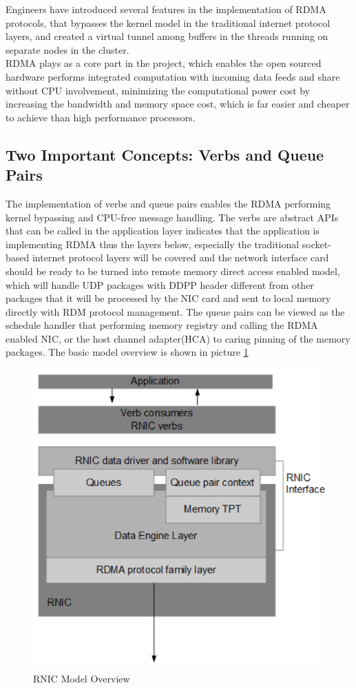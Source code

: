 \documentclass[11pt,openright,a4paper]{report}
\begin{document}
Engineers have introduced several features in the implementation of RDMA protocols, that bypasses the kernel model in the traditional internet protocol layers, and created a virtual tunnel among buffers in the threads running on separate nodes in the cluster.\\
RDMA plays as a core part in the project, which enables the open sourced hardware performs integrated computation with incoming data feeds and share without CPU involvement,  minimizing the computational power cost by increasing the bandwidth and memory space cost, which is far easier and cheaper to achieve than high performance processors.\\
\subsection{Two Important Concepts: Verbs and Queue Pairs}
The implementation of verbs and queue pairs enables the RDMA performing kernel bypassing and CPU-free message handling\cite{recio2003rdma}. The verbs are abstract APIs that can be called in the application layer indicates that the application is implementing RDMA thus the layers below, especially the traditional socket-based internet protocol layers will be covered and the network interface card should be ready to be turned into remote memory direct access enabled model,  which will handle UDP packages with DDPP header different from other packages that it will be processed by the NIC card and sent to local memory directly with RDM protocol management. The queue pairs can be viewed as the schedule handler that performing memory registry and calling the RDMA enabled NIC, or the host channel adapter(HCA) to caring pinning of the memory packages\cite{subramoni2009rdma}. The basic model overview is shown in picture \ref{fig:rnic}\\
\begin{figure}[H]
	\centering
    \includegraphics[width=0.4\linewidth]{picture/rnic.PNG}
    \caption{RNIC Model Overview}
    \label{fig:rnic}
\end{figure}
\end{document}
